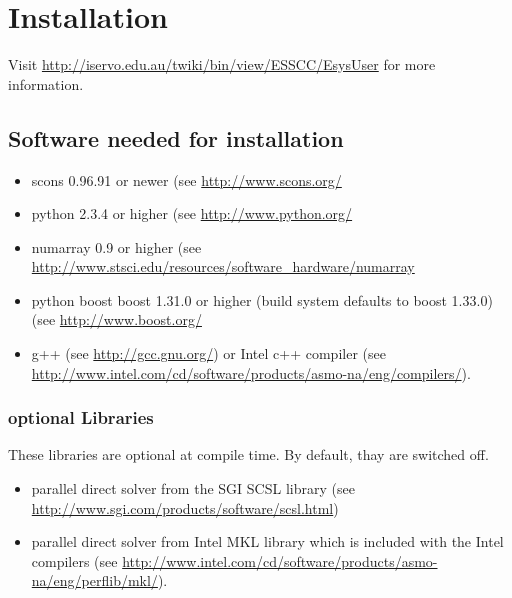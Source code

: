 %
%
%
%
%
%

\chapter{Installation}
\label{INSTALL}

Visit \url{http://iservo.edu.au/twiki/bin/view/ESSCC/EsysUser} for more information.

\section{Software needed for installation}

\begin{itemize}
   \item scons  0.96.91 or newer (see \url{http://www.scons.org/}
   \item python  2.3.4 or higher (see \url{http://www.python.org/}
   \item numarray  0.9 or higher (see \url{http://www.stsci.edu/resources/software_hardware/numarray}
   \item python boost boost  1.31.0 or higher (build system defaults to boost 1.33.0) (see \url{http://www.boost.org/}
   \item g++ (see \url{http://gcc.gnu.org/}) or Intel c++  compiler (see \\
\url{http://www.intel.com/cd/software/products/asmo-na/eng/compilers/}).
\end{itemize}

\subsection{optional Libraries}
These libraries are optional at compile time. By default, thay are switched off.
\begin{itemize}
   \item parallel direct solver from the SGI SCSL library (see \url{http://www.sgi.com/products/software/scsl.html})
   \item parallel direct solver from Intel MKL library which is included with the Intel compilers (see \url{http://www.intel.com/cd/software/products/asmo-na/eng/perflib/mkl/}).
\end{itemize}

